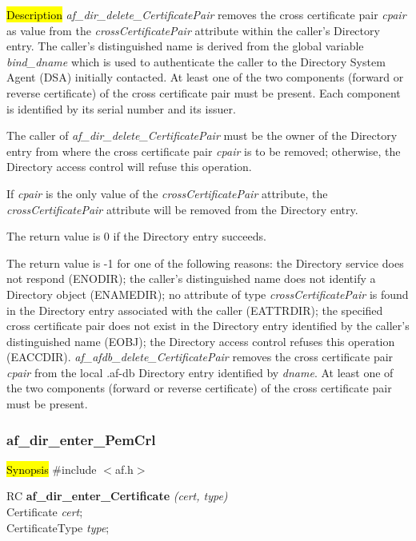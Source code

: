 \hl{Description}
{\em af\_dir\_delete\_CertificatePair} removes the cross certificate pair {\em cpair} 
as value from the {\em crossCertificatePair} attribute within the caller's Directory 
entry. The caller's distinguished name is derived from
the global variable {\em bind\_dname} which is used to authenticate the caller to the
Directory System Agent (DSA) initially contacted. At least one of the two components 
(forward or reverse certificate) of the cross 
certificate pair must be present. Each component is identified by its serial number
and its issuer.

The caller of {\em af\_dir\_delete\_CertificatePair} must be the owner of the Directory
entry from where the cross certificate pair {\em cpair} is to be removed; otherwise, the 
Directory access control will refuse this operation.

If {\em cpair} is the only value of the {\em crossCertificatePair} attribute, the 
{\em crossCertificatePair} attribute will be removed from the Directory entry.

The return value is 0 if the Directory entry succeeds.

The return value is -1 for one of the following reasons:
\bi
\m the Directory service does not respond (ENODIR);
\m the caller's distinguished name does not identify a Directory object (ENAMEDIR);
\m no attribute of type {\em crossCertificatePair} is found in the Directory entry 
associated with the caller (EATTRDIR);
\m the specified cross certificate pair does not exist in the Directory entry 
identified by the caller's distinguished name (EOBJ);
\m the Directory access control refuses this operation (EACCDIR).
\ei
{\em af\_afdb\_delete\_CertificatePair} removes the cross certificate pair {\em cpair} 
from the local .af-db Directory entry identified by {\em dname}. At least one of the two components 
(forward or reverse certificate) of the cross certificate pair must be present.



\subsubsection{af\_dir\_enter\_PemCrl}
\label{af_enter_Certificate}
\hl{Synopsis}
\#include $<$af.h$>$ 

RC {\bf af\_dir\_enter\_Certificate} {\em (cert, type)} \\
Certificate {\em *cert}; \\
CertificateType {\em type}; 

